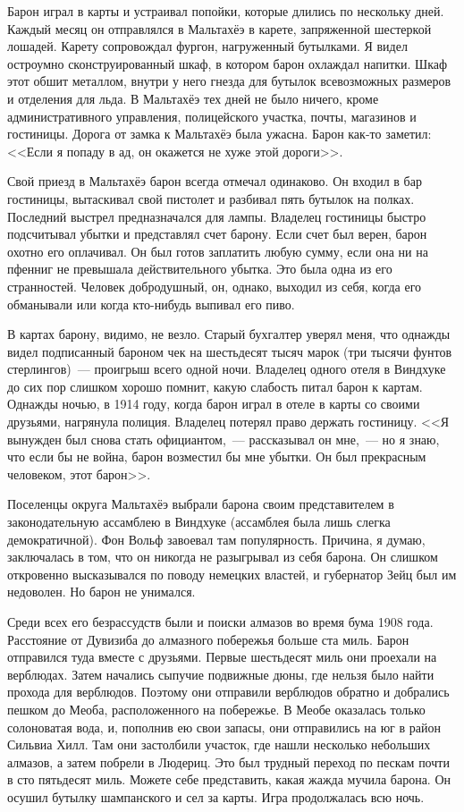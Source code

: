 \documentclass[12pt,a4paper,twoside,openany,svgnames]{memoir}
\begin{document}
Барон играл в карты и устраивал попойки, которые длились по нескольку дней. Каждый месяц он отправлялся в Мальтахёэ в карете, запряженной шестеркой лошадей. Карету сопровождал фургон, нагруженный бутылками. Я видел остроумно сконструированный шкаф, в котором барон охлаждал напитки. Шкаф этот обшит металлом, внутри у него гнезда для бутылок всевозможных размеров и отделения для льда. В Мальтахёэ тех дней не было ничего, кроме административного управления, полицейского участка, почты, магазинов и гостиницы. Дорога от замка к Мальтахёэ была ужасна. Барон как-то заметил: <<Если я попаду в ад, он окажется не хуже этой дороги>>.

Свой приезд в Мальтахёэ барон всегда отмечал одинаково. Он входил в бар гостиницы, вытаскивал свой пистолет и разбивал пять бутылок на полках. Последний выстрел предназначался для лампы. Владелец гостиницы быстро подсчитывал убытки и представлял счет барону. Если счет был верен, барон охотно его оплачивал. Он был готов заплатить любую сумму, если она ни на пфенниг не превышала действительного убытка. Это была одна из его странностей. Человек добродушный, он, однако, выходил из себя, когда его обманывали или когда кто-нибудь выпивал его пиво.

В картах барону, видимо, не везло. Старый бухгалтер уверял меня, что однажды видел подписанный бароном чек на шестьдесят тысяч марок (три тысячи фунтов стерлингов)~--- проигрыш всего одной ночи. Владелец одного отеля в Виндхуке до сих пор слишком хорошо помнит, какую слабость питал барон к картам. Однажды ночью, в 1914 году, когда барон играл в отеле в карты со своими друзьями, нагрянула полиция. Владелец потерял право держать гостиницу. <<Я вынужден был снова стать официантом,~--- рассказывал он мне,~--- но я знаю, что если бы не война, барон возместил бы мне убытки. Он был прекрасным человеком, этот барон>>.

Поселенцы округа Мальтахёэ выбрали барона своим представителем в законодательную ассамблею в Виндхуке (ассамблея была лишь слегка демократичной). Фон Вольф завоевал там популярность. Причина, я думаю, заключалась в том, что он никогда не разыгрывал из себя барона. Он слишком откровенно высказывался по поводу немецких властей, и губернатор Зейц был им недоволен. Но барон не унимался.

Среди всех его безрассудств были и поиски алмазов во время бума 1908 года. Расстояние от Дувизиба до алмазного побережья больше ста миль. Барон отправился туда вместе с друзьями. Первые шестьдесят миль они проехали на верблюдах. Затем начались сыпучие подвижные дюны, где нельзя было найти прохода для верблюдов. Поэтому они отправили верблюдов обратно и добрались пешком до Меоба, расположенного на побережье. В Меобе оказалась только солоноватая вода, и, пополнив ею свои запасы, они отправились на юг в район Сильвиа Хилл. Там они застолбили участок, где нашли несколько небольших алмазов, а затем побрели в Людериц. Это был трудный переход по пескам почти в сто пятьдесят миль. Можете себе представить, какая жажда мучила барона. Он осушил бутылку шампанского и сел за карты. Игра продолжалась всю ночь.
\end{document}
